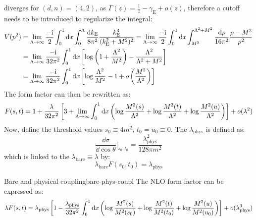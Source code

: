  diverges for $ (d,n) = (4,2) $, as $ \Gamma(z) = \frac{1}{z} - \gamma_\text{E} + o(z) $, therefore a cutoff needs to be introduced to regularize the integral:
\begin{equation*}
  \begin{split}
    V(p^2)
    & = \lim_{\Lambda \rightarrow \infty} \frac{-\mathrm{i}}{2} \int_0^1 \mathrm{d} x \int_0^\Lambda \frac{\mathrm{d} k_\text{E}}{8\pi^2} \frac{k_\text{E}^3}{(k_\text{E}^2 + M^2)^2} = \lim_{\Lambda \rightarrow \infty} \frac{-\mathrm{i}}{2} \int_0^1 \mathrm{d} x \int_{M^2}^{\Lambda^2 + M^2} \frac{\mathrm{d} \rho}{16\pi^2} \frac{\rho - M^2}{\rho^2} \\
    & = \lim_{\Lambda \rightarrow \infty} \frac{-\mathrm{i}}{32 \pi^2} \int_0^1 \mathrm{d} x \left[ \log \left( 1 + \frac{\Lambda^2}{M^2} \right) - \frac{\Lambda^2}{\Lambda^2 + M^2} \right] \\
    & = \lim_{\Lambda \rightarrow \infty} \frac{-\mathrm{i}}{32\pi^2} \int_0^1 \mathrm{d} x \left[ \log \frac{\Lambda^2}{M^2} - 1 + o  \left( \frac{M^2}{\Lambda^2} \right) \right]
  \end{split}
\end{equation*}
The form factor can then be rewritten as:
\begin{equation}
  F(s,t) = 1 + \frac{\lambda}{32\pi^2} \left[ 3 + \lim_{\Lambda \rightarrow \infty} \int_0^1 \mathrm{d} x \left( \log \frac{M^2(s)}{\Lambda^2} + \log \frac{M^2(t)}{\Lambda^2} + \log \frac{M^2(u)}{\Lambda^2} \right) \right] + o(\lambda^2)
  \label{eq:form-factor}
\end{equation}
Now, define the threshold values $ s_0 \equiv 4m^2 $, $ t_0 = u_0 \equiv 0 $. The  $ \lambda_\text{phys} $ is defined as:
\begin{equation}
  \frac{\dd \sigma}{\dd \cos \theta}\bigg\vert_{s_0 , t_0} = \frac{\lambda_\text{phys}^2}{128\pi m^2}
\end{equation}
which is linked to the  $ \lambda_\text{bare} \equiv \lambda $ by:
\begin{equation}
  \lambda_\text{bare} F(s_0,t_0) = \lambda_\text{phys}
  \label{eq:bare-phys-def}
\end{equation}

\begin{proposition}{Bare and physical coupling}{bare-phys-coupl}
  The NLO form factor can be expressed as:
  \begin{equation}
    \lambda F(s,t) = \lambda_\text{phys} \left[ 1 - \frac{\lambda_\text{phys}}{32\pi^2} \int_0^1 \mathrm{d} x \left( \log \frac{M^2(s)}{M^2(s_0)} + \log \frac{M^2(t)}{M^2(t_0)} + \log \frac{M^2(u)}{M^2(u_0)} \right) \right] + o(\lambda_\text{phys}^3)
    \label{eq:l-f-cutoff}
  \end{equation}
\end{proposition}

